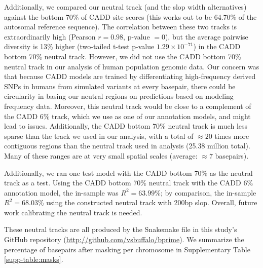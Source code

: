 \documentclass[11pt]{article}
\begin{document}
Additionally, we compared our neutral track (and the slop width alternatives)
against the bottom 70\% of CADD site scores (this works out to be 64.70\% of
the autosomal reference sequence). The correlation between these two tracks is
extraordinarily high (Pearson $r = 0.98$, p-value $=0$), but the average
pairwise diversity is 13\% higher (two-tailed t-test p-value $1.29 \times
10^{-71}$) in the CADD bottom 70\% neutral track. However, we did not use the
CADD bottom 70\%  neutral track in our analysis of human population genomic
data. Our concern was that because CADD models are trained by differentiating
high-frequency derived SNPs in humans from simulated variants at every
basepair, there could be circularity in basing our neutral regions on
predictions based on modeling frequency data. Moreover, this neutral track
would be close to a complement of the CADD 6\% track, which we use as one of
our annotation models, and might lead to issues. Additionally, the CADD bottom
70\% neutral track is much less sparse than the track we used in our analysis,
with a total of $\approx 20$ times more contiguous regions than the neutral
track used in analysis (25.38 million total). Many of these ranges are at very
small spatial scales (average: $\approx 7$ basepairs).

Additionally, we ran one test model with the CADD bottom 70\% as the neutral
track as a test. Using the CADD bottom 70\% neutral track with the CADD 6\%
annotation model, the in-sample was $R^2=63.99$\%; by comparison, the in-sample
$R^2=68.03$\% using the constructed neutral track with 200bp slop. Overall,
future work calibrating the neutral track is needed.

These neutral tracks are all produced by the Snakemake file
 in this study's GitHub repository
(\url{http://github.com/vsbuffalo/bprime}). We summarize the percentage of
basepairs after masking per chromosome in Supplementary Table
\ref{supp-table:masks}.
\end{document}
